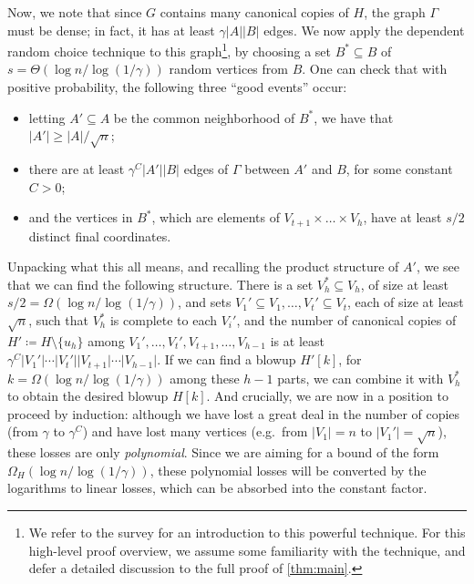 \documentclass{aic}
\theoremstyle{plain}
\theoremstyle{remark}
\newcommand\ab[1]{\lvert #1 \rvert}
\begin{document}
Now, we note that since $G$ contains many canonical copies of $H$, the graph $\Gamma$ must be dense; in fact, it has at least $\gamma \ab A \ab B$ edges. We now apply the dependent random choice technique to this graph\footnote{We refer to the survey \cite{MR2768884} for an introduction to this powerful technique. For this high-level proof overview, we assume some familiarity with the technique, and defer a detailed discussion to the full proof of \cref{thm:main}.}, by choosing a set $B^*\subseteq B$ of $s = \Theta(\log n/{\log (1/\gamma)})$ random vertices from $B$. One can check that with positive probability, the following three ``good events'' occur:
\begin{itemize}
    \item letting $A'\subseteq A$ be the common neighborhood of $B^*$, we have that $\ab{A'} \geq \ab A/{\sqrt n}$;
    \item there are at least $\gamma^C \ab{A'} \ab B$ edges of $\Gamma$ between $A'$ and $B$, for some constant $C>0$;
    \item and the vertices in $B^*$, which are elements of $V_{t+1}\times \dots \times V_h$, have at least $s/2$ distinct final coordinates.
\end{itemize}
Unpacking what this all means, and recalling the product structure of $A'$, we see that we can find the following structure. There is a set $V_h^* \subseteq V_h$, of size at least $s/2 = \Omega(\log n/{\log(1/\gamma)})$, and sets $V_1' \subseteq V_1,\dots,V_t' \subseteq V_t$, each of size at least $\sqrt n$, such that $V_h^*$ is complete to each $V_i'$, and the number of canonical copies of $H' \coloneqq H\setminus \{u_h\}$ among $V_1',\dots,V_t',V_{t+1},\dots,V_{h-1}$ is at least $\gamma^C \ab{V_1'}\dotsb \ab{V_t'}\ab{V_{t+1}}\dotsb\ab{V_{h-1}}$. If we can find a blowup $H'[k]$, for $k = \Omega(\log n/{\log(1/\gamma)})$ among these $h-1$ parts, we can combine it with $V_h^*$ to obtain the desired blowup $H[k]$. And crucially, we are now in a position to proceed by induction: although we have lost a great deal in the number of copies (from $\gamma$ to $\gamma^C$) and have lost many vertices (e.g.\ from $\ab{V_1}=n$ to $\ab{V_1'}=\sqrt n$), these losses are only \emph{polynomial}. Since we are aiming for a bound of the form $\Omega_H(\log n/{\log(1/\gamma)})$, these polynomial losses will be converted by the logarithms to linear losses, which can be absorbed into the constant factor. 
\end{document}
